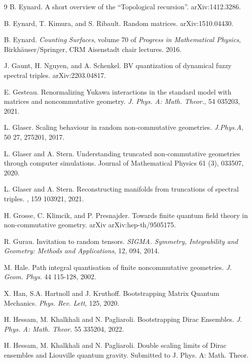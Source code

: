 \documentclass[10pt]{article}
\begin{document}
\begin{thebibliography}{9}
B. Eynard. A short overview of the ``Topological recursion''. 	arXiv:1412.3286. 

B. Eynard, T. Kimura, and S. Ribault. Random matrices. arXiv:1510.04430.

B. Eynard. \textit{ Counting Surfaces}, volume 70 of \textit{Progress in Mathematical Physics}, Birkh\"{a}user/Springer,  CRM Aisenstadt chair lectures. 2016.



J. Gaunt, H. Nguyen, and  A. Schenkel. BV quantization of dynamical fuzzy spectral triples. 	arXiv:2203.04817. 

E. Gesteau. Renormalizing Yukawa interactions in the standard model with matrices and noncommutative geometry. \textit{J. Phys. A: Math. Theor.}, 54 035203, 2021.

L. Glaser. Scaling behaviour in random non-commutative geometries.\textit{ J.Phys.A}, 50 27, 275201, 2017.

L. Glaser and A. Stern. Understanding truncated non-commutative geometries through computer simulations. Journal of Mathematical Physics 61 (3), 033507, 2020.

L. Glaser and A. Stern.
Reconstructing manifolds from truncations of spectral triples.
, 159
103921, 2021.

H. Grosse, C. Klimcik, and P. Presnajder. Towards finite quantum field theory in non-commutative geometry. arXiv 	arXiv:hep-th/9505175.

R. Gurau. Invitation to random tensors. \textit{SIGMA. Symmetry, Integrability and Geometry: Methods and Applications}, 12, 094, 2014.


M. Hale. Path integral quantisation of finite noncommutative geometries. \textit{J. Geom. Phys.} 44 115-128, 2002.

X. Han, S.A. Hartnoll and J. Kruthoff. Bootstrapping Matrix Quantum Mechanics. \textit{Phys.
	Rev. Lett}, 125, 2020.

 H. Hessam, M. Khalkhali and N. Pagliaroli. Bootstrapping Dirac Ensembles. \textit{J. Phys. A: Math. Theor.} 55 335204, 2022.

 H. Hessam, M. Khalkhali and N. Pagliaroli. Double scaling limits of Dirac ensembles and Liouville quantum gravity. Submitted to J. Phys. A: Math. Theor.





\end{thebibliography}
\end{document}
